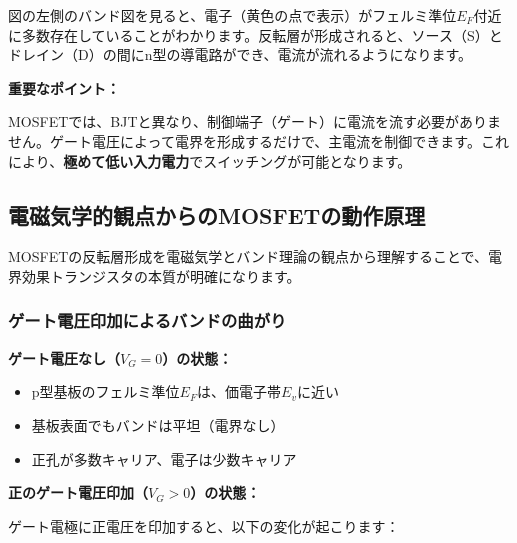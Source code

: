 図の左側のバンド図を見ると、電子（黄色の点で表示）がフェルミ準位$E_F$付近に多数存在していることがわかります。反転層が形成されると、ソース（S）とドレイン（D）の間にn型の導電路ができ、電流が流れるようになります。

\textbf{重要なポイント：}

MOSFETでは、BJTと異なり、制御端子（ゲート）に電流を流す必要がありません。ゲート電圧によって電界を形成するだけで、主電流を制御できます。これにより、\textbf{極めて低い入力電力}でスイッチングが可能となります。

\subsection{電磁気学的観点からのMOSFETの動作原理}

MOSFETの反転層形成を電磁気学とバンド理論の観点から理解することで、電界効果トランジスタの本質が明確になります。

\subsubsection{ゲート電圧印加によるバンドの曲がり}

\textbf{ゲート電圧なし（$V_G = 0$）の状態：}

\begin{itemize}
\item p型基板のフェルミ準位$E_F$は、価電子帯$E_v$に近い
\item 基板表面でもバンドは平坦（電界なし）
\item 正孔が多数キャリア、電子は少数キャリア
\end{itemize}

\textbf{正のゲート電圧印加（$V_G > 0$）の状態：}

ゲート電極に正電圧を印加すると、以下の変化が起こります：

